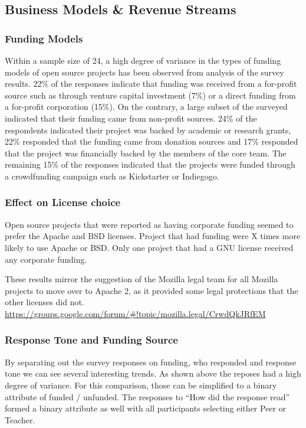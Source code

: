 \subsection{Business Models \& Revenue Streams}


\subsubsection{Funding Models}
Within a sample size of 24, a high degree of variance in the types of funding models of open source projects has been observed from analysis of the survey results. 22\% of the responses indicate that funding was received from a for-profit source such as through venture capital investment (7\%) or a direct funding from a for-profit corporation (15\%). On the contrary, a large subset of the surveyed indicated that their funding came from non-profit sources. 24\% of the respondents indicated their project was backed by academic or research grants, 22\% responded that the funding came from donation sources and 17\% responded that the project was financially backed by the members of the core team. The remaining 15\% of the responses indicated that the projects were funded through a crowdfunding campaign such as Kickstarter or Indiegogo.

\subsubsection{Effect on License choice}
Open source projects that were reported as having corporate funding seemed to prefer the Apache and BSD licenses. Project that had funding were X times more likely to use Apache or BSD. Only one project that had a GNU license received any corporate funding. 



These results mirror the suggestion of the Mozilla legal team for all Mozilla projects to move over to Apache 2, as it provided some legal protections that the other licenses did not. \url{https://groups.google.com/forum/#!topic/mozilla.legal/CrwdQkJRfEM}

\subsubsection{Response Tone and Funding Source}
By separating out the survey responses on funding, who responded and response tone we can see several interesting trends. As shown above the reposes had a high degree of variance. For this comparison, those can be simplified to a binary attribute of funded / unfunded. The responses to “How did the response read” formed a binary attribute as well with all participants selecting either Peer or Teacher.

